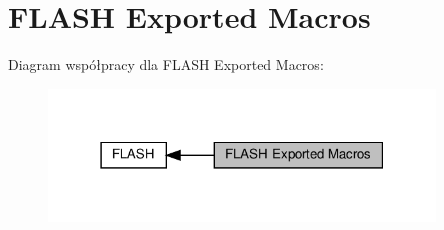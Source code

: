 \hypertarget{group___f_l_a_s_h___exported___macros}{}\section{F\+L\+A\+SH Exported Macros}
\label{group___f_l_a_s_h___exported___macros}
Diagram współpracy dla F\+L\+A\+SH Exported Macros\+:\nopagebreak
\begin{figure}[H]
\begin{center}
\leavevmode
\includegraphics[width=291pt]{group___f_l_a_s_h___exported___macros}
\end{center}
\end{figure}
